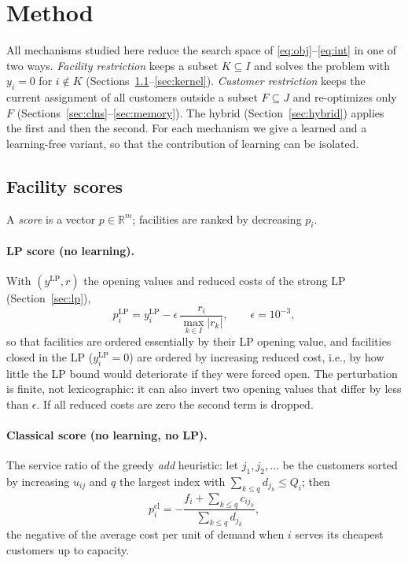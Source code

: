 \section{Method}\label{sec:method}

All mechanisms studied here reduce the search space of \eqref{eq:obj}--\eqref{eq:int} in one of
two ways. \emph{Facility restriction} keeps a subset $K\subseteq I$ and solves the problem with
$y_i=0$ for $i\notin K$ (Sections~\ref{sec:gnn}--\ref{sec:kernel}). \emph{Customer restriction}
keeps the current assignment of all customers outside a subset $F\subseteq J$ and re-optimizes
only $F$ (Sections~\ref{sec:clns}--\ref{sec:memory}). The hybrid (Section~\ref{sec:hybrid})
applies the first and then the second. For each mechanism we give a learned and a learning-free
variant, so that the contribution of learning can be isolated.

\subsection{Facility scores}\label{sec:gnn}
A \emph{score} is a vector $p\in\mathbb{R}^m$; facilities are ranked by decreasing $p_i$.

\paragraph{LP score (no learning).} With $(y^{\mathrm{LP}},r)$ the opening values and reduced
costs of the strong LP (Section~\ref{sec:lp}),
\begin{equation}\label{eq:lpscore}
p^{\mathrm{LP}}_i = y^{\mathrm{LP}}_i - \epsilon\,\frac{r_i}{\max_{k\in I}|r_k|},\qquad
\epsilon=10^{-3},
\end{equation}
so that facilities are ordered essentially by their LP opening value, and facilities closed in
the LP ($y^{\mathrm{LP}}_i=0$) are ordered by increasing reduced cost, i.e., by how little the LP
bound would deteriorate if they were forced open. The perturbation is finite, not lexicographic:
it can also invert two opening values that differ by less than $\epsilon$. If all reduced costs
are zero the second term is dropped.

\paragraph{Classical score (no learning, no LP).} The service ratio of the greedy \emph{add}
heuristic: let $j_1,j_2,\dots$ be the customers sorted by increasing $u_{ij}$ and $q$ the largest
index with $\sum_{k\le q} d_{j_k}\le Q_i$; then
\begin{equation}
p^{\mathrm{cl}}_i=-\frac{f_i+\sum_{k\le q}c_{ij_k}}{\sum_{k\le q}d_{j_k}},
\end{equation}
the negative of
the average cost per unit of demand when $i$ serves its cheapest customers up to capacity.

